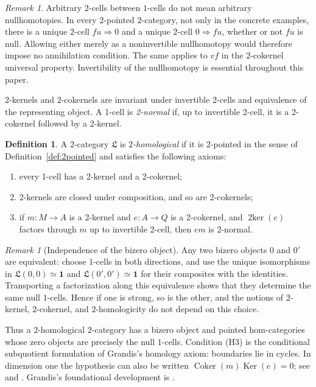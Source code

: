 \documentclass[11pt,reqno,a4paper]{amsart}
\theoremstyle{definition}
\newtheorem{definition}[theorem]{Definition}
\theoremstyle{remark}
\newtheorem{remark}[theorem]{Remark}
\newcommand{\0}{\mathbf{0}}
\renewcommand{\1}{\mathbf{1}}
\newcommand{\Lcat}{\mathfrak L}
\newcommand{\twoker}{\operatorname{2ker}}
\DeclareMathOperator{\Ker}{Ker}
\DeclareMathOperator{\Coker}{Coker}
\begin{document}
\begin{remark}\label{rem:notlax}
Arbitrary $2$-cells between $1$-cells do not mean arbitrary
nullhomotopies. In every $2$-pointed $2$-category, not only in the
concrete examples, there is a unique $2$-cell $fu\Rightarrow0$ and
a unique $2$-cell $0\Rightarrow fu$, whether or not $fu$ is null.
Allowing either merely as a noninvertible nullhomotopy would therefore
impose no annihilation condition. The same applies to $vf$ in the
$2$-cokernel universal property. Invertibility of the nullhomotopy
is essential throughout this paper.
\end{remark}

$2$-kernels and $2$-cokernels are invariant under invertible 2-cells and
equivalence of the representing object. A 1-cell is \emph{2-normal} if,
up to invertible 2-cell, it is a 2-cokernel followed by a 2-kernel.

\begin{definition}\label{def:homological}
A $2$-category $\Lcat$ is \emph{$2$-homological} if it is
$2$-pointed in the sense of Definition~\ref{def:2pointed} and satisfies
the following axioms:
\begin{enumerate}[label=\textup{(H\arabic*)},leftmargin=16mm]
\item every 1-cell has a 2-kernel and a 2-cokernel;
\item 2-kernels are closed under composition, and so are 2-cokernels;
\item if $m:M\to A$ is a 2-kernel and $e:A\to Q$ is a 2-cokernel,
and $\twoker(e)$ factors through $m$ up to invertible 2-cell, then $em$
is 2-normal.
\end{enumerate}
\end{definition}

\begin{remark}[Independence of the bizero object]\label{rem:bizero-independence}
Any two bizero objects $0$ and $0'$ are equivalent: choose
$1$-cells in both directions, and use the unique isomorphisms in
$\Lcat(0,0)\simeq\mathbf1$ and
$\Lcat(0',0')\simeq\mathbf1$ for their composites with the
identities. Transporting a factorization along this equivalence
shows that they determine the same null $1$-cells. Hence if one
is strong, so is the other, and the notions of $2$-kernel,
$2$-cokernel, and $2$-homologicity do not depend on this choice.
\end{remark}

Thus a $2$-homological $2$-category has a bizero object and pointed
hom-categories whose zero objects are precisely the null $1$-cells.
Condition (H3) is the conditional subquotient formulation of Grandis's
homology axiom: boundaries lie in cycles. In dimension one the hypothesis
can also be written $\Coker(m)\Ker(e)=0$; see
\cite[Section 1.3.6]{Grandis13} and \cite[Definition 2.16]{Fritz}.
Grandis's foundational development is \cite{Grandis92}.
\end{document}
